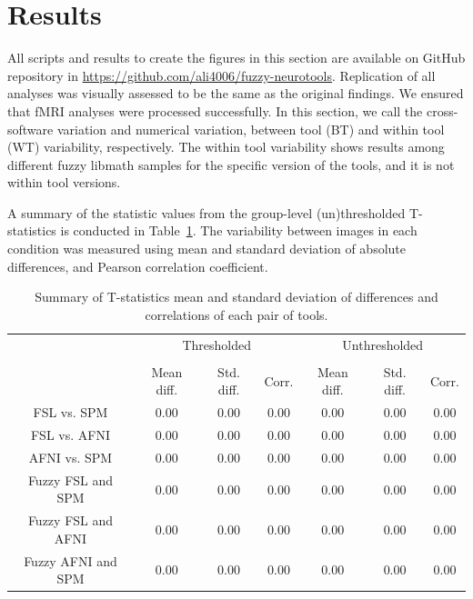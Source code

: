\documentclass[runningheads]{llncs}
\begin{document}
\section{Results}

All scripts and results to create the figures in this section are available on GitHub repository
in \url{https://github.com/ali4006/fuzzy-neurotools}.
Replication of all analyses was visually assessed to be the same as the original findings.
We ensured that fMRI analyses were processed successfully.
In this section, we call the cross-software variation and numerical variation,
between tool (BT) and within tool (WT) variability, respectively. 
The within tool variability shows results among different fuzzy libmath
samples for the specific version of the tools, and it is not within tool versions.


A summary of the statistic values from the group-level (un)thresholded T-statistics is conducted in
Table~\ref{table:pipeline-stats}.
The variability between images in each condition was measured using mean and standard deviation of absolute differences,
and Pearson correlation coefficient.


\setlength{\tabcolsep}{10pt}
\begin{table}[h]
    \centering
    \begin{tabular}{cccc|ccc}
        \toprule
        \multirow{2}{*}{} & \multicolumn{3}{c}{Thresholded} & \multicolumn{3}{c}{Unthresholded} \\
        \cmidrule{2-4} \cmidrule{5-7} \\
        {} & Mean diff. & Std. diff. & Corr. & Mean diff. & Std. diff. & Corr.  \\
        \midrule
        \rowcolor{lightgray}
        FSL vs. SPM          &  0.00       & 0.00      & 0.00       & 0.00     & 0.00       & 0.00 \\
        \rowcolor{lightgray}
        FSL vs. AFNI         &  0.00       & 0.00      & 0.00       & 0.00     & 0.00       & 0.00 \\
        \rowcolor{lightgray}
        AFNI vs. SPM         &  0.00       & 0.00      & 0.00       & 0.00     & 0.00       & 0.00 \\
        Fuzzy FSL and SPM    &  0.00       & 0.00      & 0.00       & 0.00     & 0.00       & 0.00 \\
        Fuzzy FSL and AFNI   &  0.00       & 0.00      & 0.00       & 0.00     & 0.00       & 0.00 \\
        Fuzzy AFNI and SPM   &  0.00       & 0.00      & 0.00       & 0.00     & 0.00       & 0.00 \\
        \bottomrule
    \end{tabular}
    \caption{Summary of T-statistics mean and standard deviation of differences and correlations of each pair of tools.}
    \label{table:pipeline-stats}
\end{table}
\end{document}
